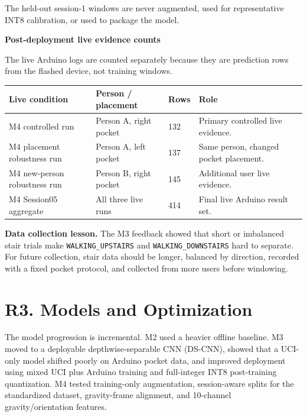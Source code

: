 \documentclass[11pt,a4paper]{article}
\begin{document}
The held-out session-1 windows are never augmented, used for representative INT8 calibration, or used to package the model.

\textbf{Post-deployment live evidence counts}

The live Arduino logs are counted separately because they are prediction rows from the flashed device, not training windows.

\begin{center}
\small
\begin{tabular}{|p{4.1cm}|p{3.2cm}|p{2.0cm}|p{4.1cm}|}
\hline
\rowcolor{headergray}
\textbf{Live condition} & \textbf{Person / placement} & \textbf{Rows} & \textbf{Role}\\
\hline
M4 controlled run & Person A, right pocket & 132 & Primary controlled live evidence.\\
\hline
M4 placement robustness run & Person A, left pocket & 137 & Same person, changed pocket placement.\\
\hline
M4 new-person robustness run & Person B, right pocket & 145 & Additional user live evidence.\\
\hline
\rowcolor{softblue}
M4 Session05 aggregate & All three live runs & 414 & Final live Arduino result set.\\
\hline
\end{tabular}
\end{center}
\normalsize

\textbf{Data collection lesson.} The M3 feedback showed that short or imbalanced stair trials make \texttt{WALKING\_UPSTAIRS} and \texttt{WALKING\_DOWNSTAIRS} hard to separate. For future collection, stair data should be longer, balanced by direction, recorded with a fixed pocket protocol, and collected from more users before windowing.

\section{R3. Models and Optimization}

The model progression is incremental. M2 used a heavier offline baseline. M3 moved to a deployable depthwise-separable CNN (DS-CNN), showed that a UCI-only model shifted poorly on Arduino pocket data, and improved deployment using mixed UCI plus Arduino training and full-integer INT8 post-training quantization. M4 tested training-only augmentation, session-aware splits for the standardized dataset, gravity-frame alignment, and 10-channel gravity/orientation features.
\end{document}
